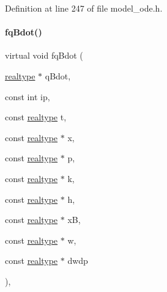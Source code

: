 Definition at line 247 of file model\+\_\+ode.\+h.

\mbox{\label{classamici_1_1_model___o_d_e_a3eb796dbb29fd20c70366fb642c2a1e3}} 
\paragraph{\texorpdfstring{fq\+Bdot()}{fqBdot()}\hspace{0.1cm}{\footnotesize\ttfamily [2/2]}}
{\footnotesize\ttfamily virtual void fq\+Bdot (\begin{DoxyParamCaption}\item[{\mbox{\hyperlink{namespaceamici_a1bdce28051d6a53868f7ccbf5f2c14a3}{realtype}} $\ast$}]{q\+Bdot,  }\item[{const int}]{ip,  }\item[{const \mbox{\hyperlink{namespaceamici_a1bdce28051d6a53868f7ccbf5f2c14a3}{realtype}}}]{t,  }\item[{const \mbox{\hyperlink{namespaceamici_a1bdce28051d6a53868f7ccbf5f2c14a3}{realtype}} $\ast$}]{x,  }\item[{const \mbox{\hyperlink{namespaceamici_a1bdce28051d6a53868f7ccbf5f2c14a3}{realtype}} $\ast$}]{p,  }\item[{const \mbox{\hyperlink{namespaceamici_a1bdce28051d6a53868f7ccbf5f2c14a3}{realtype}} $\ast$}]{k,  }\item[{const \mbox{\hyperlink{namespaceamici_a1bdce28051d6a53868f7ccbf5f2c14a3}{realtype}} $\ast$}]{h,  }\item[{const \mbox{\hyperlink{namespaceamici_a1bdce28051d6a53868f7ccbf5f2c14a3}{realtype}} $\ast$}]{xB,  }\item[{const \mbox{\hyperlink{namespaceamici_a1bdce28051d6a53868f7ccbf5f2c14a3}{realtype}} $\ast$}]{w,  }\item[{const \mbox{\hyperlink{namespaceamici_a1bdce28051d6a53868f7ccbf5f2c14a3}{realtype}} $\ast$}]{dwdp }\end{DoxyParamCaption})\hspace{0.3cm}{\ttfamily [protected]}, {\ttfamily [virtual]}}

